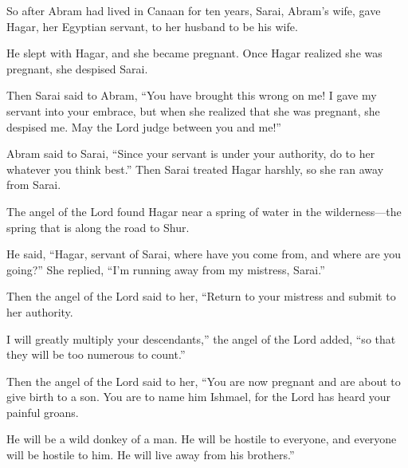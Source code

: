 \begin{scripture}
 So after Abram had lived in Canaan for ten years, Sarai, Abram's wife, gave Hagar, her Egyptian servant, to her husband to be his wife.
 He slept with Hagar, and she became pregnant. Once Hagar realized she was pregnant, she despised Sarai.
 Then Sarai said to Abram, ``You have brought this wrong on me! I gave my servant into your embrace, but when she realized that she was pregnant, she despised me. May the Lord judge between you and me!''
\everypar{}

 Abram said to Sarai, ``Since your servant is under your authority, do to her whatever you think best.'' Then Sarai treated Hagar harshly, so she ran away from Sarai.
\everypar{}

 The angel of the Lord found Hagar near a spring of water in the wilderness---the spring that is along the road to Shur.
 He said, ``Hagar, servant of Sarai, where have you come from, and where are you going?'' She replied, ``I'm running away from my mistress, Sarai.''
\everypar{}

 Then the angel of the Lord said to her, ``Return to your mistress and submit to her authority.
 I will greatly multiply your descendants,'' the angel of the Lord added, ``so that they will be too numerous to count.''
\everypar{}

 Then the angel of the Lord said to her, ``You are now pregnant and are about to give birth to a son. You are to name him Ishmael, for the Lord has heard your painful groans.
\everypar{}

 He will be a wild donkey of a man. He will be hostile to everyone, and everyone will be hostile to him. He will live away from his brothers.''
\everypar{}


\end{scripture}
